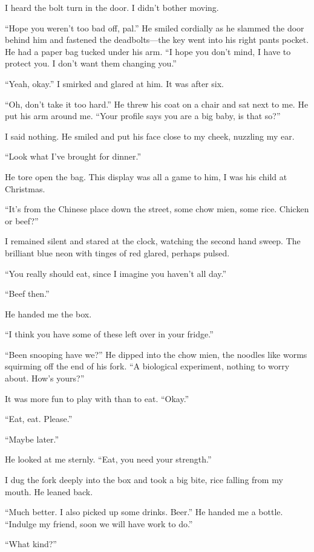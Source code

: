 I heard the bolt turn in the door. I didn't bother moving.

``Hope you weren't too bad off, pal.'' He smiled cordially as he slammed
the door behind him and fastened the deadbolts---the key went into his
right pants pocket. He had a paper bag tucked under his arm. ``I hope
you don't mind, I have to protect you. I don't want them changing you.''

``Yeah, okay.'' I smirked and glared at him. It was after six.

``Oh, don't take it too hard.'' He threw his coat on a chair and sat
next to me. He put his arm around me. ``Your profile says you are a big
baby, is that so?''

I said nothing. He smiled and put his face close to my cheek, nuzzling
my ear.

``Look what I've brought for dinner.''

He tore open the bag. This display was all a game to him, I was his
child at Christmas.

``It's from the Chinese place down the street, some chow mien, some
rice. Chicken or beef?''

I remained silent and stared at the clock, watching the second hand
sweep. The brilliant blue neon with tinges of red glared, perhaps
pulsed.

``You really should eat, since I imagine you haven't all day.''

``Beef then.''

He handed me the box.

``I think you have some of these left over in your fridge.''

``Been snooping have we?'' He dipped into the chow mien, the noodles
like worms squirming off the end of his fork. ``A biological experiment,
nothing to worry about. How's yours?''

It was more fun to play with than to eat. ``Okay.''

``Eat, eat. Please.''

``Maybe later.''

He looked at me sternly. ``Eat, you need your strength.''

I dug the fork deeply into the box and took a big bite, rice falling
from my mouth. He leaned back.

``Much better. I also picked up some drinks. Beer.'' He handed me a
bottle. ``Indulge my friend, soon we will have work to do.''

``What kind?''

